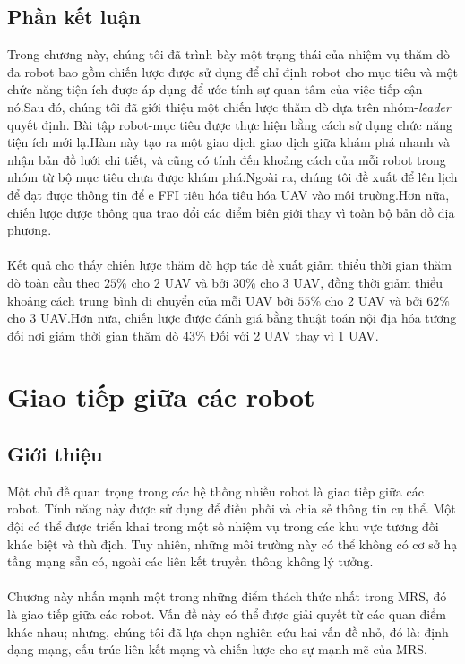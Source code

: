 \documentclass[11pt,openany]{book}
\begin{document}
\begin{algorimth}[H]
\section{Phần kết luận}
Trong chương này, chúng tôi đã trình bày một trạng thái của nhiệm vụ thăm dò đa robot bao gồm chiến lược được sử dụng để chỉ định robot cho mục tiêu và một chức năng tiện ích được áp dụng để ước tính sự quan tâm của việc tiếp cận nó.Sau đó, chúng tôi đã giới thiệu một chiến lược thăm dò dựa trên nhóm-\textit{leader} quyết định. Bài tập robot-mục tiêu được thực hiện bằng cách sử dụng chức năng tiện ích mới lạ.Hàm này tạo ra một giao dịch giao dịch giữa khám phá nhanh và nhận bản đồ lưới chi tiết, và cũng có tính đến khoảng cách của mỗi robot trong nhóm từ bộ mục tiêu chưa được khám phá.Ngoài ra, chúng tôi đề xuất để lên lịch để đạt được thông tin để e FFI tiêu hóa tiêu hóa UAV vào môi trường.Hơn nữa, chiến lược được thông qua trao đổi các điểm biên giới thay vì toàn bộ bản đồ địa phương.\\\\
Kết quả cho thấy chiến lược thăm dò hợp tác đề xuất giảm thiểu thời gian thăm dò toàn cầu theo $25\%$ cho 2 UAV và bởi $30\%$ cho 3 UAV, đồng thời giảm thiểu khoảng cách trung bình di chuyển của mỗi UAV bởi $55\%$ cho 2 UAV và bởi $62\%$ cho 3 UAV.Hơn nữa, chiến lược được đánh giá bằng thuật toán nội địa hóa tương đối nơi giảm thời gian thăm dò $43\%$ Đối với 2 UAV thay vì 1 UAV.
\chapter{Giao tiếp giữa các robot}
\section{Giới thiệu}
Một chủ đề quan trọng trong các hệ thống nhiều robot là giao tiếp giữa các robot. Tính năng này được sử dụng để điều phối và chia sẻ thông tin cụ thể. Một đội có thể được triển khai trong một số nhiệm vụ trong các khu vực tương đối khác biệt và thù địch. Tuy nhiên, những môi trường này có thể không có cơ sở hạ tầng mạng sẵn có, ngoài các liên kết truyền thông không lý tưởng.\\\\
Chương này nhấn mạnh một trong những điểm thách thức nhất trong MRS, đó là giao tiếp giữa các robot. Vấn đề này có thể được giải quyết từ các quan điểm khác nhau; nhưng, chúng tôi đã lựa chọn nghiên cứu hai vấn đề nhỏ, đó là: định dạng mạng, cấu trúc liên kết mạng và chiến lược cho sự mạnh mẽ của MRS.

\end{algorimth}
\end{document}
